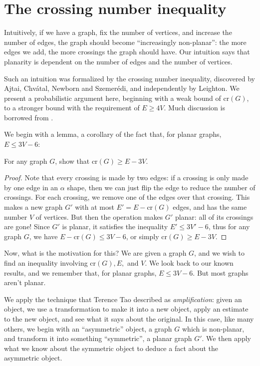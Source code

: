 \documentclass[11pt,paper=letter]{scrartcl}
\newcommand{\crs}[1]{\mathrm{cr}(#1)}
\begin{document}
\section{The crossing number inequality}

Intuitively, if we have a graph, fix the number of vertices, and increase the number of edges, the graph should become ``increasingly non-planar'': the more edges we add, the more crossings the graph should have. Our intuition says that planarity is dependent on the number of edges and the number of vertices.

Such an intuition was formalized by the crossing number inequality, discovered by Ajtai, Chv\'{a}tal, Newborn and Szemer\'{e}di, and independently by Leighton. We present a probabilistic argument here, beginning with a weak bound of $\crs{G}$, to a stronger bound with the requirement of $E \geq 4V$. Much discussion is borrowed from \cite{tao}.

We begin with a lemma, a corollary of the fact that, for planar graphs, $E \leq 3V - 6$:

\begin{problem}
For any graph $G$, show that $\crs{G} \geq E - 3V$.
\end{problem}

\begin{proof}
Note that every crossing is made by two edges: if a crossing is only made by one edge in an $\alpha$ shape, then we can just flip the edge to reduce the number of crossings. For each crossing, we remove one of the edges over that crossing. This makes a new graph $G'$ with at most $E' = E - \crs{G}$ edges, and has the same number $V$ of vertices. But then the operation makes $G'$ planar: all of its crossings are gone! Since $G'$ is planar, it satisfies the inequality $E' \leq 3V' - 6$, thus for any graph $G$, we have $E - \crs{G} \leq 3V - 6$, or simply $\crs{G} \geq E - 3V$.
\end{proof}

Now, what is the motivation for this? We are given a graph $G$, and we wish to find an inequality involving $\crs{G}, E,$ and $V$. We look back to our known results, and we remember that, for planar graphs, $E \leq 3V - 6$. But most graphs aren't planar.

We apply the technique that Terence Tao described as \emph{amplification}: given an object, we use a transformation to make it into a new object, apply an estimate to the new object, and see what it says about the original. In this case, like many others, we begin with an ``asymmetric'' object, a graph $G$ which is non-planar, and transform it into something ``symmetric'', a planar graph $G'$. We then apply what we know about the symmetric object to deduce a fact about the asymmetric object.
\end{document}
